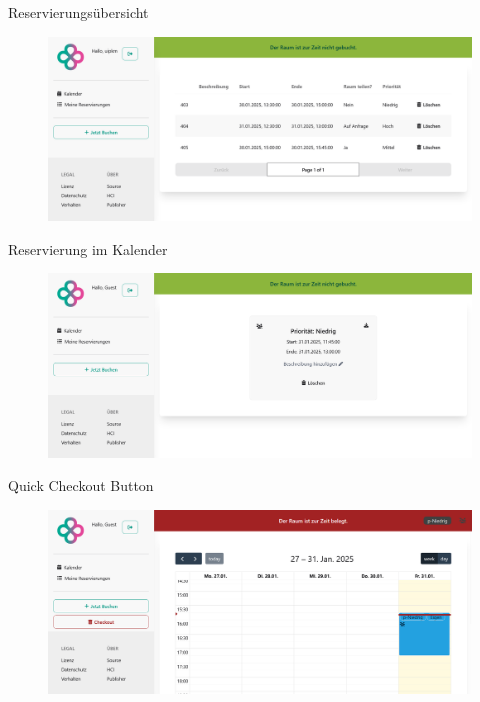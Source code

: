 \begin{frame}{Reservierungsübersicht}
    \thispagestyle{plain}
    \begin{figure}
        \centering
        \includegraphics[width=1\linewidth]{pictures/bookings_list.png}
        \label{fig:enter-label}
    \end{figure}
\end{frame}

\begin{frame}{Reservierung im Kalender}
    \thispagestyle{plain}
    \begin{figure}
        \centering
        \includegraphics[width=1\linewidth]{pictures/bookings_single.png}
        \label{fig:enter-label}
    \end{figure}
\end{frame}

\begin{frame}{Quick Checkout Button}
    \thispagestyle{plain}
    \begin{figure}
        \centering
        \includegraphics[width=1\linewidth]{pictures/check_out_button_light.png}
        \label{fig:enter-label}
    \end{figure}
\end{frame}

